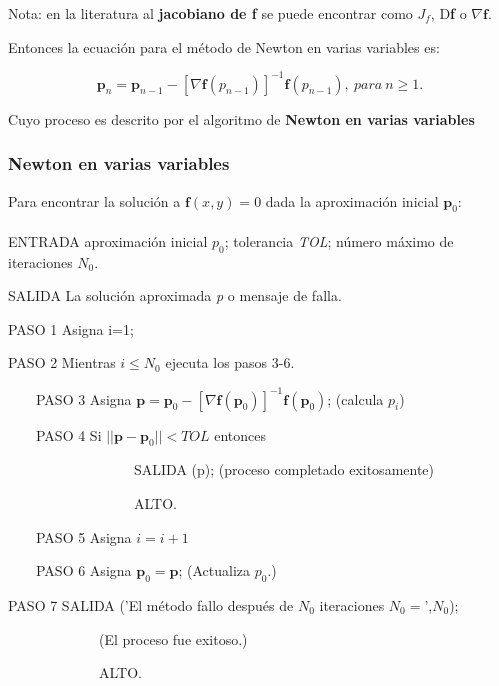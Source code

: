 Nota: en la literatura al \textbf{jacobiano de f} se puede encontrar como \textbf{$J_f$}, D\textbf{f} o $ \nabla\textbf{f} $. 

Entonces la ecuación para el método de Newton en varias variables es:

\begin{equation*}
    \textbf{p}_n= \textbf{p}_{n-1} -[\nabla\textbf{f}(p_{n-1})]^{-1} \textbf{f}(p_{n-1}), \ para \ n\geq 1.
\end{equation*}

Cuyo proceso es descrito por el algoritmo de \textbf{Newton en varias variables}

\begin{tcolorbox}[colback=blue!15!]
\subsubsection*{Newton en varias variables}
Para encontrar la solución a $\textbf{f}(x,y)=0$ dada la aproximación inicial $\textbf{p}_0$:
\\ \\
ENTRADA aproximación inicial $p_0$; tolerancia \textit{TOL}; número máximo de iteraciones $N_0$.

SALIDA La solución aproximada \textit{p} o mensaje de falla.

PASO 1 Asigna i=1;

PASO 2 Mientras $i\leq N_0$ ejecuta los pasos 3-6.

\ \ \ \  PASO 3 Asigna $\textbf{p}=\textbf{p}_0 -[\nabla\textbf{f}(\textbf{p}_0)]^{-1} \textbf{f}(\textbf{p}_0) $; (calcula $p_i$)

\ \ \ \  PASO 4 Si $||\textbf{p}-\textbf{p}_0||<TOL$ entonces

\ \ \ \ \ \ \ \ \ \ \ \ \ \ \ \ \ \ SALIDA (p); (proceso completado exitosamente)

\ \ \ \ \ \ \ \ \ \ \ \ \ \ \ \ \ \ ALTO.

\ \ \ \   PASO 5 Asigna $i=i+1$
    
\ \ \ \   PASO 6 Asigna $\textbf{p}_0=\textbf{p}$; (Actualiza $p_0$.)

PASO 7 SALIDA ('El método fallo después de $N_0$ iteraciones $N_0=$',$N_0$);

\ \ \ \ \ \ \ \ \ \ \ \ \ (El proceso fue exitoso.)

\ \ \ \ \ \ \ \ \ \ \ \ \ ALTO.


\end{tcolorbox}